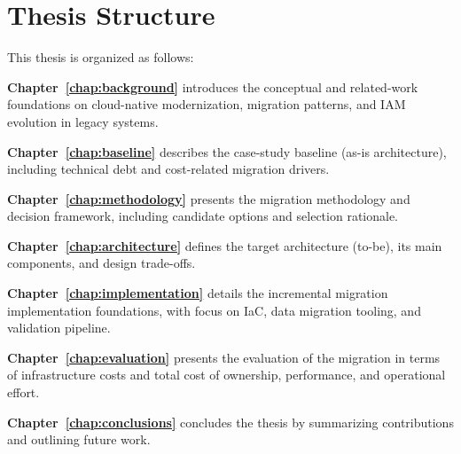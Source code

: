 \section{Thesis Structure}
This thesis is organized as follows:

\textbf{Chapter~\ref{chap:background}} introduces the conceptual and related-work foundations on cloud-native modernization, migration patterns, and IAM evolution in legacy systems.

\textbf{Chapter~\ref{chap:baseline}} describes the case-study baseline (as-is architecture), including technical debt and cost-related migration drivers.

\textbf{Chapter~\ref{chap:methodology}} presents the migration methodology and decision framework, including candidate options and selection rationale.

\textbf{Chapter~\ref{chap:architecture}} defines the target architecture (to-be), its main components, and design trade-offs.

\textbf{Chapter~\ref{chap:implementation}} details the incremental migration implementation foundations, with focus on IaC, data migration tooling, and validation pipeline.

\textbf{Chapter~\ref{chap:evaluation}} presents the evaluation of the migration in terms of infrastructure costs and total cost of ownership, performance, and operational effort.

\textbf{Chapter~\ref{chap:conclusions}} concludes the thesis by summarizing contributions and outlining future work.
